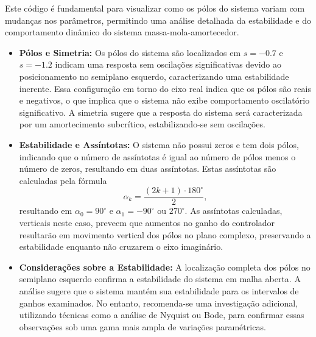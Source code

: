 Este código é fundamental para visualizar como os pólos do sistema variam com mudanças nos parâmetros, permitindo uma análise detalhada da estabilidade e do comportamento dinâmico do sistema massa-mola-amortecedor.

\begin{itemize}
    \item \textbf{Pólos e Simetria:}
          Os pólos do sistema são localizados em \( s = -0.7 \) e \( s = -1.2 \) indicam uma resposta sem oscilações significativas devido ao posicionamento no semiplano esquerdo, caracterizando uma estabilidade inerente. Essa configuração em torno do eixo real indica que os pólos são reais e negativos, o que implica que o sistema não exibe comportamento oscilatório significativo. A simetria sugere que a resposta do sistema será caracterizada por um amortecimento subcrítico, estabilizando-se sem oscilações.

    \item \textbf{Estabilidade e Assíntotas:}
          O sistema não possui zeros e tem dois pólos, indicando que o número de assíntotas é igual ao número de pólos menos o número de zeros, resultando em duas assíntotas. Estas assíntotas são calculadas pela fórmula \[
              \alpha_k = \frac{(2k + 1) \cdot 180^\circ}{2},
          \] resultando em \( \alpha_0 = 90^\circ \) e \( \alpha_1 = -90^\circ \) ou \( 270^\circ \). As assíntotas calculadas, verticais neste caso, preveem que aumentos no ganho do controlador resultarão em movimento vertical dos pólos no plano complexo, preservando a estabilidade enquanto não cruzarem o eixo imaginário.

    \item \textbf{Considerações sobre a Estabilidade:}
          A localização completa dos pólos no semiplano esquerdo confirma a estabilidade do sistema em malha aberta. A análise sugere que o sistema mantém sua estabilidade para os intervalos de ganhos examinados. No entanto, recomenda-se uma investigação adicional, utilizando técnicas como a análise de Nyquist ou Bode, para confirmar essas observações sob uma gama mais ampla de variações paramétricas.
\end{itemize}

